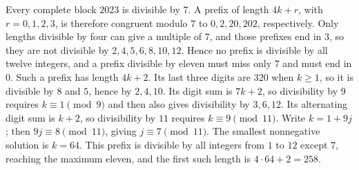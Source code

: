 Every complete block $2023$ is divisible by $7$. A prefix of length $4k+r$, with $r=0,1,2,3$, is therefore congruent modulo $7$ to $0,2,20,202$, respectively. Only lengths divisible by four can give a multiple of $7$, and those prefixes end in $3$, so they are not divisible by $2,4,5,6,8,10,12$. Hence no prefix is divisible by all twelve integers, and a prefix divisible by eleven must miss only $7$ and must end in $0$. Such a prefix has length $4k+2$. Its last three digits are $320$ when $k\ge1$, so it is divisible by $8$ and $5$, hence by $2,4,10$. Its digit sum is $7k+2$, so divisibility by $9$ requires $k\equiv1\pmod9$ and then also gives divisibility by $3,6,12$. Its alternating digit sum is $k+2$, so divisibility by $11$ requires $k\equiv9\pmod{11}$. Write $k=1+9j$; then $9j\equiv8\pmod{11}$, giving $j\equiv7\pmod{11}$. The smallest nonnegative solution is $k=64$. This prefix is divisible by all integers from $1$ to $12$ except $7$, reaching the maximum eleven, and the first such length is $4\cdot64+2=\boxed{258}$.
